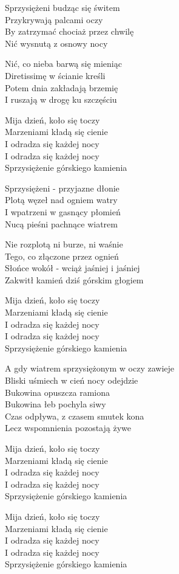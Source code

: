 \begin{text}
    Sprzysiężeni budząc się świtem\\
    Przykrywają palcami oczy\\
    By zatrzymać chociaż przez chwilę\\
    Nić wysnutą z osnowy nocy

    Nić, co nieba barwą się mieniąc\\
    Diretissimę w ścianie kreśli\\
    Potem dnia zakładają brzemię\\
    I ruszają w drogę ku szczęściu

    Mija dzień, koło się toczy\\
    Marzeniami kładą się cienie\\
    I odradza się każdej nocy\\
    I odradza się każdej nocy\\
    Sprzysiężenie górskiego kamienia

    Sprzysiężeni - przyjazne dłonie\\
    Plotą węzeł nad ogniem watry\\
    I wpatrzeni w gasnący płomień\\
    Nucą pieśni pachnące wiatrem

    Nie rozplotą ni burze, ni waśnie\\
    Tego, co złączone przez ognień\\
    Słońce wokół - wciąż jaśniej i jaśniej\\
    Zakwitł kamień dziś górskim głogiem

    Mija dzień, koło się toczy\\
    Marzeniami kładą się cienie\\
    I odradza się każdej nocy\\
    I odradza się każdej nocy\\
    Sprzysiężenie górskiego kamienia

    A gdy wiatrem sprzysiężonym w oczy zawieje\\
    Bliski uśmiech w cień nocy odejdzie\\
    Bukowina opuszcza ramiona\\
    Bukowina łeb pochyla siwy\\
    Czas odpływa, z czasem smutek kona\\
    Lecz wspomnienia pozostają żywe

    Mija dzień, koło się toczy\\
    Marzeniami kładą się cienie\\
    I odradza się każdej nocy\\
    I odradza się każdej nocy\\
    Sprzysiężenie górskiego kamienia

    Mija dzień, koło się toczy\\
    Marzeniami kładą się cienie\\
    I odradza się każdej nocy\\
    I odradza się każdej nocy\\
    Sprzysiężenie górskiego kamienia
\end{text}
\begin{chord}

\end{chord}